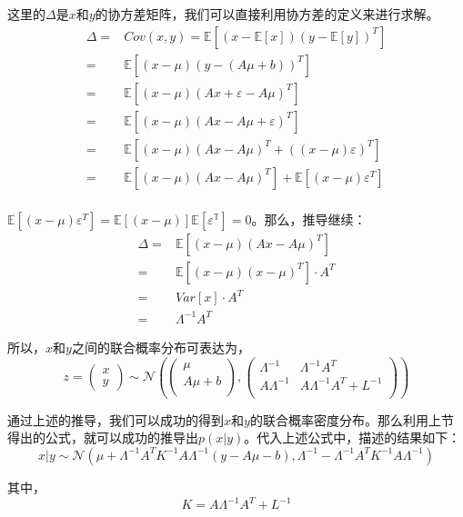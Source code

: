 \documentclass[a4paper]{article}
\begin{document}
这里的$\Delta$是$x$和$y$的协方差矩阵，我们可以直接利用协方差的定义来进行求解。
\begin{equation}
    \begin{split}
       \Delta = & Cov(x,y)= \mathbb{E}[(x-\mathbb{E}[x])(y-\mathbb{E}[y])^T]  \\
       = & \mathbb{E}[(x-\mu)(y-(A\mu + b))^T] \\
       = & \mathbb{E}[(x-\mu)(Ax+\varepsilon-A\mu)^T] \\
       = & \mathbb{E}[(x-\mu)(Ax-A\mu+\varepsilon)^T] \\
       = & \mathbb{E}[(x-\mu)(Ax-A\mu)^T+((x-\mu)\varepsilon)^T] \\
       = & \mathbb{E}[(x-\mu)(Ax-A\mu)^T]+\mathbb{E}[(x-\mu)\varepsilon^T] \\
  \end{split}
\end{equation}

$\mathbb{E}[(x-\mu)\varepsilon^T]=\mathbb{E}[(x-\mu)]\mathbb{E[\varepsilon^T]}=0$。那么，推导继续：
\begin{equation}
    \begin{split}
       \Delta
       = & \mathbb{E}[(x-\mu)(Ax-A\mu)^T] \\
       = & \mathbb{E}[(x-\mu)(x-\mu)^T]\cdot A^T \\
       = & Var[x]\cdot A^T \\
       = & \Lambda^{-1} A^T
  \end{split}
\end{equation}

所以，$x$和$y$之间的联合概率分布可表达为，
\begin{equation}
    z=
    \begin{pmatrix}
        x \\ 
        y
    \end{pmatrix} \sim
    \mathcal{N}
    \left(
    \begin{pmatrix}
        \mu \\
        A\mu + b \\
    \end{pmatrix}
    ,
    \begin{pmatrix}
        \Lambda^{-1} & \Lambda^{-1} A^T \\
        A\Lambda^{-1}  & A\Lambda^{-1}A^T +L^{-1} \\
    \end{pmatrix}
    \right)
\end{equation}

通过上述的推导，我们可以成功的得到$x$和$y$的联合概率密度分布。那么利用上节得出的公式，就可以成功的推导出$p(x|y)$。代入上述公式中，描述的结果如下：
\begin{equation}
    x|y\sim \mathcal{N}\left(\mu+\Lambda^{-1}A^TK^{-1}A\Lambda^{-1}\left(y-A\mu-b\right), \Lambda^{-1}-\Lambda^{-1}A^TK^{-1}A\Lambda^{-1}\right)
\end{equation}

其中，
\begin{equation}
    K=A\Lambda^{-1}A^T+L^{-1}
\end{equation}
\end{document}
